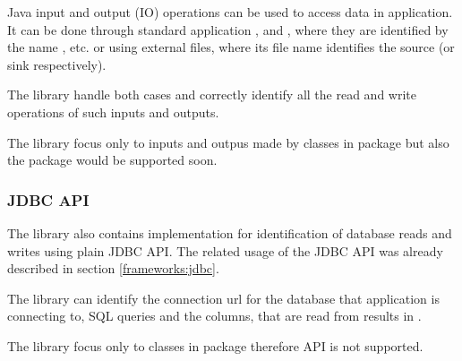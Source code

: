 Java input and output (IO) operations can be used to access data in application.
It can be done through standard application
,  and ,
where they are identified by the name , etc.
or using external files, where its file name identifies the source (or sink respectively).

The library handle both cases and correctly identify
all the read and write operations of such inputs and outputs.

The library focus only to inputs and outpus made by classes in  package
but also the  package would be supported soon.




\subsubsection{JDBC API}

The library also contains implementation for identification of
database reads and writes using plain JDBC API.
The related usage of the JDBC API was already described in section \ref{frameworks:jdbc}.

The library can identify the connection url for the database
that application is connecting to, SQL queries and the columns,
that are read from results in .

The library focus only to classes in package 
therefore  API is not supported.

